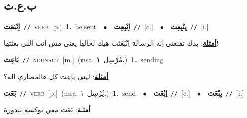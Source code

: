 \documentclass[10pt,a4paper,twoside]{article} %
\begin{document}
\begin{multicols}{2}
\vspace{-3mm}
\subsection*{\color{blue}\foreignlanguage{arabic}{ب.ع.ث}\color{blue}{}} 

{\setlength\topsep{0pt}\textbf{\foreignlanguage{arabic}{اِنْبَعَث}}\ {\color{gray}\texttt{//}\color{black}}\ \textsc{verb}\ [p.]\ \textbf{1.}~be sent\ \ $\bullet$\ \ \setlength\topsep{0pt}\textbf{\foreignlanguage{arabic}{اِنْبِعِث}}\ {\color{gray}\texttt{//}\color{black}}\ [c.]\ \ $\bullet$\ \ \setlength\topsep{0pt}\textbf{\foreignlanguage{arabic}{يِنْبِعِث}}\ {\color{gray}\texttt{//}\color{black}}\ [i.]\  \begin{flushright}\color{gray}\foreignlanguage{arabic}{\textbf{\underline{\foreignlanguage{arabic}{أمثلة}}}: بدك تقنعني إنه الرسالة اِنْبَعَثت هيك لحالها يعني مش أنت اللي بعثتها!}\end{flushright}\color{black}} \vspace{2mm}

{\setlength\topsep{0pt}\textbf{\foreignlanguage{arabic}{بَاعِث}}\ {\color{gray}\texttt{//}\color{black}}\ \textsc{noun\textunderscore act}\ [m.]\ \color{gray}(msa. \foreignlanguage{arabic}{مُرْسِل}~\foreignlanguage{arabic}{\textbf{١.}})\color{black}\ \textbf{1.}~sending\  \begin{flushright}\color{gray}\foreignlanguage{arabic}{\textbf{\underline{\foreignlanguage{arabic}{أمثلة}}}: ليش باعِث كل هالمصاري اله؟}\end{flushright}\color{black}} \vspace{2mm}

{\setlength\topsep{0pt}\textbf{\foreignlanguage{arabic}{بَعَث}}\ {\color{gray}\texttt{//}\color{black}}\ \textsc{verb}\ [p.]\ \color{gray}(msa. \foreignlanguage{arabic}{يُرْسِل}~\foreignlanguage{arabic}{\textbf{١.}})\color{black}\ \textbf{1.}~send\ \ $\bullet$\ \ \setlength\topsep{0pt}\textbf{\foreignlanguage{arabic}{اِبْعَث}}\ {\color{gray}\texttt{//}\color{black}}\ [c.]\ \ $\bullet$\ \ \setlength\topsep{0pt}\textbf{\foreignlanguage{arabic}{يِبْعَث}}\ {\color{gray}\texttt{//}\color{black}}\ [i.]\  \begin{flushright}\color{gray}\foreignlanguage{arabic}{\textbf{\underline{\foreignlanguage{arabic}{أمثلة}}}: بَعَث معي بوكسة بندورة}\end{flushright}\color{black}} \vspace{2mm}


\end{multicols}
\end{document}
